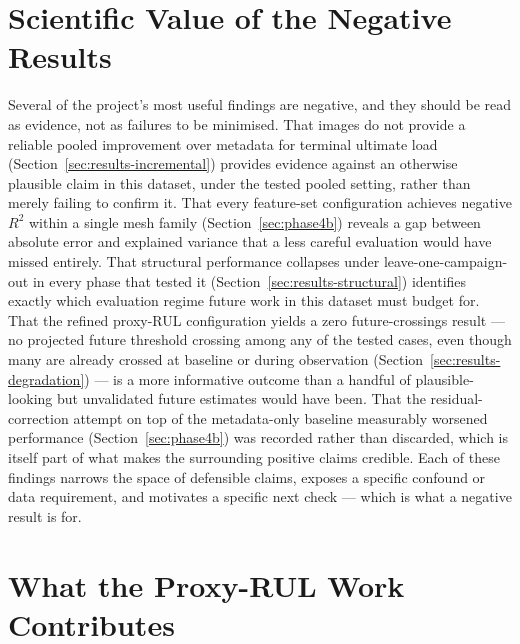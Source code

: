 \section{Scientific Value of the Negative Results}
\label{sec:interp-negative}

Several of the project's most useful findings are negative, and they
should be read as evidence, not as failures to be minimised. That images
do not provide a reliable pooled improvement over metadata for terminal
ultimate load (Section~\ref{sec:results-incremental}) provides evidence
against an otherwise plausible claim in this dataset, under the tested
pooled setting, rather than merely failing to confirm it. That
every feature-set configuration achieves negative $R^2$ within a single
mesh family (Section~\ref{sec:phase4b}) reveals a gap between absolute
error and explained variance that a less careful evaluation would have
missed entirely. That structural performance collapses under
leave-one-campaign-out in every phase that tested it
(Section~\ref{sec:results-structural}) identifies exactly which evaluation
regime future work in this dataset must budget for. That the refined
proxy-RUL configuration yields a zero future-crossings result — no
projected future threshold crossing among any of the tested cases, even
though many are already crossed at baseline or during observation
(Section~\ref{sec:results-degradation}) — is a more informative outcome
than a handful of plausible-looking but unvalidated future estimates would
have been. That the residual-correction attempt on
top of the metadata-only baseline measurably worsened performance
(Section~\ref{sec:phase4b}) was recorded rather than discarded, which is
itself part of what makes the surrounding positive claims credible. Each
of these findings narrows the space of defensible claims, exposes a
specific confound or data requirement, and motivates a specific next
check — which is what a negative result is for.

\section{What the Proxy-RUL Work Contributes}
\label{sec:interp-rul}

